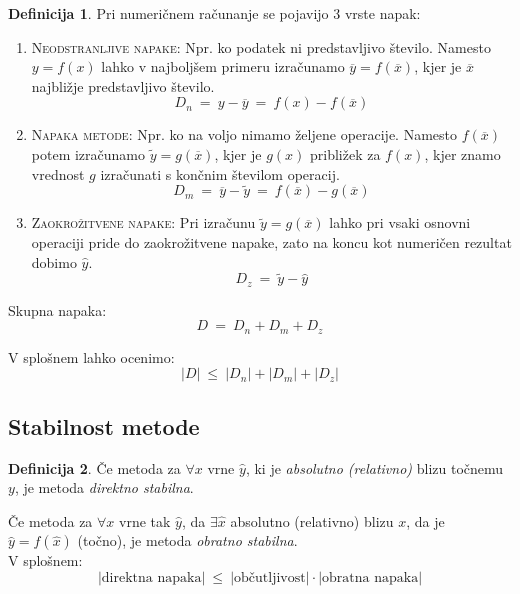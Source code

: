 \documentclass[11pt]{article}
\theoremstyle{definition}
\newtheorem{definicija}{Definicija}[section]
\begin{document}
\begin{definicija}

Pri numeričnem računanje se pojavijo 3 vrste napak:
\begin{enumerate}
	\item \textsc{Neodstranljive napake}: 
	Npr. ko podatek ni predstavljivo število. Namesto $y = f(x)$ lahko v najboljšem primeru izračunamo $\overline{y} = f(\overline{x})$, kjer je $\overline{x}$ najbližje predstavljivo število. 
	$$D_n ~=~ y - \overline{y} ~=~ f(x) - f(\overline{x})$$
	\item \textsc{Napaka metode}:
	Npr. ko na voljo nimamo željene operacije. Namesto $f(\overline{x})$ potem izračunamo $\widetilde{y}=g(\overline{x})$, kjer je $g(x)$ približek za $f(x)$, kjer znamo vrednost $g$ izračunati s končnim številom operacij. 
	$$D_m ~=~ \overline{y} - \widetilde{y} ~=~ f(\overline{x}) - g(\overline{x})$$
	\item \textsc{Zaokrožitvene napake}:
	Pri izračunu $\widetilde{y}=g(\overline{x})$ lahko pri vsaki osnovni operaciji pride do zaokrožitvene napake, zato na koncu kot numeričen rezultat dobimo $\widehat{y}$.
	$$D_z ~=~ \widetilde{y} - \widehat{y}$$
\end{enumerate}

Skupna napaka:
$$D ~=~ D_n + D_m + D_z$$

V splošnem lahko ocenimo:
$$|D| ~\leq~ |D_n| + |D_m| + |D_z|$$
\end{definicija}
\vspace{0.5cm}


\subsection{Stabilnost metode}
\vspace{0.5cm}

\begin{definicija}

Če metoda za $\forall x$ vrne $\widehat{y}$, ki je \textit{absolutno (relativno)} blizu točnemu $y$, je metoda \textit{direktno stabilna}.

Če metoda za $\forall x$ vrne tak $\widehat{y}$, da $\exists \widehat{x}$ absolutno (relativno) blizu $x$, da je $\widehat{y}=f(\widehat{x})$ (točno), je metoda \textit{obratno stabilna}. \\

\noindent V splošnem:
$$|\text{direktna napaka}| ~\leq~ |\text{občutljivost}| \cdot |\text{obratna napaka}|$$

\end{definicija}
\vspace{0.5cm}
\end{document}

